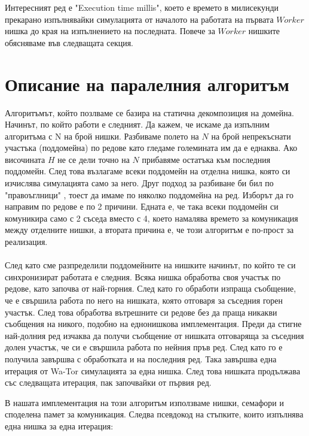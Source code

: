 \documentclass{article}
\begin{document}
Интересният ред е "Execution time millis", което е времето в милисекунди прекарано
изпълнявайки симулацията от началото на работата на първата $Worker$ нишка до края
на изпълнението на последната. Повече за $Worker$ нишките обясняваме във следващата секция.

\section{Описание на паралелния алгоритъм}
Алгоритъмът, който позлваме се базира на статична декомпозиция на домейна.
Начинът, по който работи е следният. Да кажем, че искаме да изпълним алгоритъма с N на брой нишки.
Разбиваме полето на $N$ на брой непрекъснати участъка (поддомейна) по редове като гледаме големината им
да е еднаква. Ако височината $H$ не се дели точно на $N$ прибавяме остатъка към последния поддомейн.
След това възлагаме всеки поддомейн на отделна нишка, която си изчислява симулацията само за него.
Друг подход за разбиване би бил по "правоъглници" , тоест да имаме по няколко поддомейна на ред.
Изборът да го направим по редове е по 2 причини. Едната е, че така всеки поддомейн си комуникира само
с 2 съседа вместо с 4, което намалява времето за комуникация между отделните нишки, а втората причина
е, че този алгоритъм е по-прост за реализация.
\\
\\
След като сме разпределили поддомейните на нишките начинът, по който те си синхронизират работата е следния.
Всяка нишка обработва своя участък по редове, като започва от най-горния. След като го обработи изпраща
съобщение, че е свършила работа по него на нишката, която отговаря за съседния горен участък.
След това обработва вътрешните си редове без да праща никакви съобщения на никого, подобно на еднонишкова
имплементация. Преди да стигне най-долния ред изчаква да получи съобщение от нишката отговаряща за съседния
долен участък, че си е свършила работа по нейния пръв ред. След като го е получила завършва с обработката
и на последния ред. Така завършва една итерация от Wa-Tor симулацията за една нишка. След това нишката
продължава със следващата итерация, пак започвайки от първия ред.

В нашата имплементация на този алгоритъм използваме нишки, семафори и споделена памет за комуникация.
Следва псевдокод на стъпките, които изпълнява една нишка за една итерация:

\newpage
\end{document}
